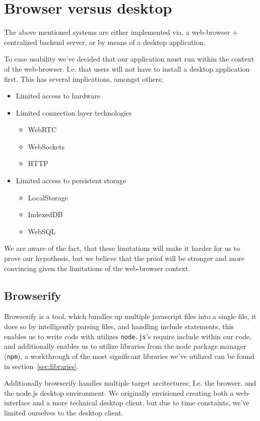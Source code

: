 \section{Browser versus desktop}
The above mentioned systems are either implemented via. a web-browser +
centralized backend server, or by means of a desktop application.

To ease usability we've decided that our application must run within the
context of the web-browser. I.e. that users will not have to install a desktop
application first. This has several implications, amongst others;
\begin{itemize}
\item Limited access to hardware
\item Limited connection layer technologies
    \begin{itemize}
        \item WebRTC
        \item WebSockets
        \item HTTP
    \end{itemize}
\item Limited access to persistent storage
    \begin{itemize}
        \item LocalStorage
        \item IndexedDB
        \item WebSQL
    \end{itemize}
\end{itemize}
We are aware of the fact, that these limitations will make it harder for us to
prove our hypothesis, but we believe that the proof will be stronger and more
convincing given the limitations of the web-browser context.

\subsection{Browserify}
Browserify is a tool, which bundles up multiple javascript files into a single
file, it does so by intelligently parsing files, and handling include
statements, this enables us to write code with utilizes \verb|node.js|'s require
include within our code, and additionally enables us to utilize libraries from
the node package manager (\verb|npm|), a workthrough of the most significant 
libraries we've utilized can be found in section~\ref{sec:libraries}.

Additionally browserify handles multiple target arcitectures; I.e. the browser,
and the node.js desktop environment. We originally envisioned creating both a 
web-interface and a more technical desktop client, but due to time constaints,
we've limited ourselves to the desktop client.

